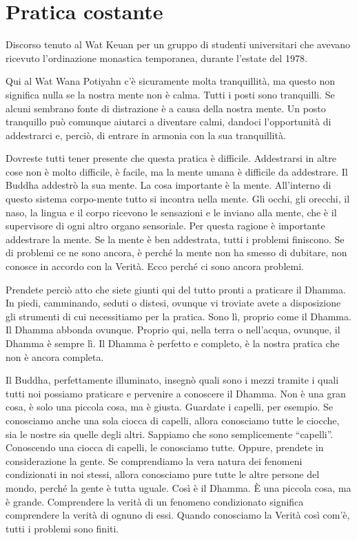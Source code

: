 \chapter{Pratica costante}

\begin{openingQuote}
  \centering

  Discorso tenuto al Wat Keuan per un gruppo di studenti universitari che
  avevano ricevuto l'ordinazione monastica temporanea, durante l'estate del
  1978.
\end{openingQuote}

Qui al Wat Wana Potiyahn c'è sicuramente molta tranquillità, ma questo
non significa nulla se la nostra mente non è calma. Tutti i posti sono
tranquilli. Se alcuni sembrano fonte di distrazione è a causa della
nostra mente. Un posto tranquillo può comunque aiutarci a diventare
calmi, dandoci l'opportunità di addestrarci e, perciò, di entrare in
armonia con la sua tranquillità.

Dovreste tutti tener presente che questa pratica è difficile.
Addestrarsi in altre cose non è molto difficile, è facile, ma la mente
umana è difficile da addestrare. Il Buddha addestrò la sua mente. La
cosa importante è la mente. All'interno di questo sistema corpo-mente
tutto si incontra nella mente. Gli occhi, gli orecchi, il naso, la
lingua e il corpo ricevono le sensazioni e le inviano alla mente, che è
il supervisore di ogni altro organo sensoriale. Per questa ragione è
importante addestrare la mente. Se la mente è ben addestrata, tutti i
problemi finiscono. Se di problemi ce ne sono ancora, è perché la mente
non ha smesso di dubitare, non conosce in accordo con la Verità. Ecco
perché ci sono ancora problemi.

Prendete perciò atto che siete giunti qui del tutto pronti a praticare
il Dhamma. In piedi, camminando, seduti o distesi, ovunque vi troviate
avete a disposizione gli strumenti di cui necessitiamo per la pratica.
Sono lì, proprio come il Dhamma. Il Dhamma abbonda ovunque. Proprio qui,
nella terra o nell'acqua, ovunque, il Dhamma è sempre lì. Il Dhamma è
perfetto e completo, è la nostra pratica che non è ancora completa.

Il Buddha, perfettamente illuminato, insegnò quali sono i mezzi tramite
i quali tutti noi possiamo praticare e pervenire a conoscere il Dhamma.
Non è una gran cosa, è solo una piccola cosa, ma è giusta. Guardate i
capelli, per esempio. Se conosciamo anche una sola ciocca di capelli,
allora conosciamo tutte le ciocche, sia le nostre sia quelle degli
altri. Sappiamo che sono semplicemente ``capelli''. Conoscendo una
ciocca di capelli, le conosciamo tutte. Oppure, prendete in
considerazione la gente. Se comprendiamo la vera natura dei fenomeni
condizionati in noi stessi, allora conosciamo pure tutte le altre
persone del mondo, perché la gente è tutta uguale. Così è il Dhamma. È
una piccola cosa, ma è grande. Comprendere la verità di un fenomeno
condizionato significa comprendere la verità di ognuno di essi. Quando
conosciamo la Verità così com'è, tutti i problemi sono finiti.

